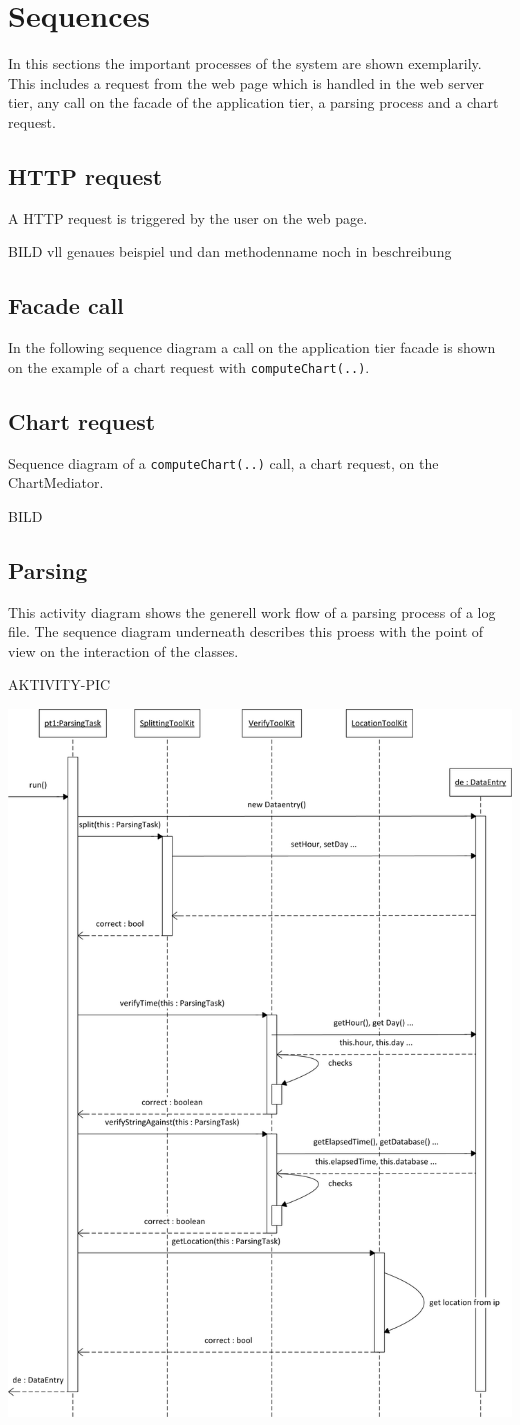 \section{Sequences}
In this sections the important processes of the system are shown exemplarily. This includes a request 
from the web page which is handled in the web server tier, any call on the facade of the application tier,
a parsing process and a chart request.

\subsection{HTTP request}
A HTTP request is triggered by the user on the web page.

BILD vll genaues beispiel und dan methodenname noch in beschreibung

\subsection{Facade call}
In the following sequence diagram a call on the application tier facade is shown 
on the example of a chart request with \texttt{computeChart(..)}.



\subsection{Chart request}
Sequence diagram of a \texttt{computeChart(..)} call, a chart request, on the ChartMediator.

BILD


\subsection{Parsing}
This activity diagram shows the generell work flow of a parsing process of a log file. 
The sequence diagram underneath describes this proess with the point of view on the 
interaction of the classes.

AKTIVITY-PIC

\begin{center}
\includegraphics[width=0.7\linewidth]{Pictures/Seq/SeqParser.png}
\end{center}



   
